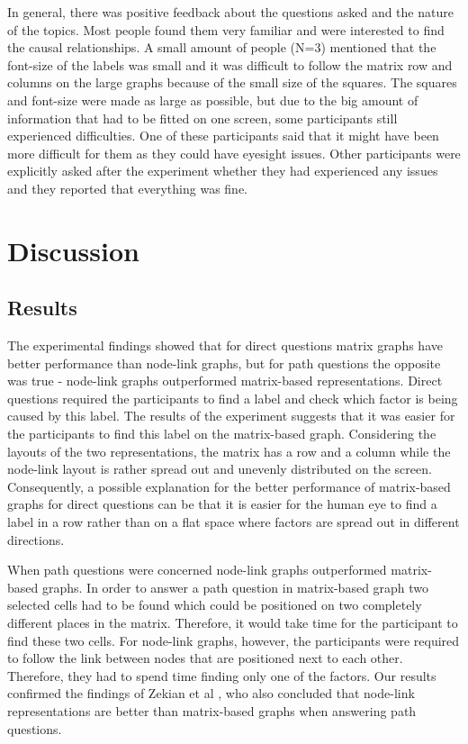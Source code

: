 \documentclass{l4proj}
\begin{document}
In general, there was positive feedback about the questions asked and the nature of the topics. Most people found them very familiar and were interested to find the causal relationships. A small amount of people (N=3) mentioned that the font-size of the labels was small and it was difficult to follow the matrix row and columns on the large graphs because of the small size of the squares. The squares and font-size were made as large as possible, but due to the big amount of information that had to be fitted on one screen, some participants still experienced difficulties. One of these participants said that it might have been more difficult for them as they could have eyesight issues. Other participants were explicitly asked after the experiment whether they had experienced any issues and they reported that everything was fine.


\chapter{Discussion}

\section{Results}

The experimental findings showed that for direct questions matrix graphs have better performance than node-link graphs, but for path questions the opposite was true - node-link graphs outperformed matrix-based representations. Direct questions required the participants to find a label and check which factor is being caused by this label. The results of the experiment suggests that it was easier for the participants to find this label on the matrix-based graph. Considering the layouts of the two representations, the matrix has a row and a column while the node-link layout is rather spread out and unevenly distributed on the screen. Consequently, a possible explanation for the better performance of matrix-based graphs for direct questions can be that it is easier for the human eye to find a label in a row rather than on a flat space where factors are spread out in different directions. 

When path questions were concerned node-link graphs outperformed matrix-based graphs. In order to answer a path question in matrix-based graph two selected cells had to be found which could be positioned on two completely different places in the matrix. Therefore, it would take time for the participant to find these two cells. For node-link graphs, however, the participants were required to follow the link between nodes that are positioned next to each other. Therefore, they had to spend time finding only one of the factors. Our results confirmed the findings of Zekian et al \cite{sheny2007path}, who also concluded that node-link representations are better than matrix-based graphs when answering path questions. 
\end{document}
